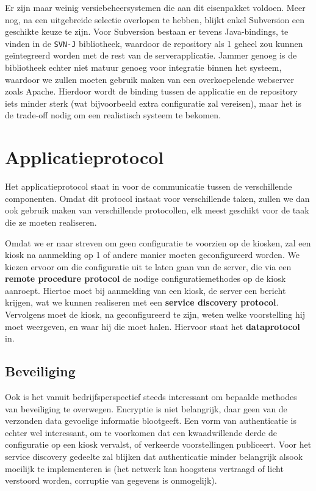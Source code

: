 Er zijn maar weinig versiebeheersystemen die aan dit eisenpakket voldoen. Meer nog, na een uitgebreide selectie overlopen te hebben, blijkt enkel Subversion een geschikte keuze te zijn. Voor Subversion bestaan er tevens Java-bindings, te vinden in de \texttt{SVN-J} bibliotheek, waardoor de repository als 1 geheel zou kunnen geïntegreerd worden met de rest van de serverapplicatie. Jammer genoeg is de bibliotheek echter niet matuur genoeg voor integratie binnen het systeem, waardoor we zullen moeten gebruik maken van een overkoepelende webserver zoals Apache. Hierdoor wordt de binding tussen de applicatie en de repository iets minder sterk (wat bijvoorbeeld extra configuratie zal vereisen), maar het is de trade-off nodig om een realistisch systeem te bekomen.

\section{Applicatieprotocol}
\label{sec:applicatieprotocol}

Het applicatieprotocol staat in voor de communicatie tussen de verschillende componenten. Omdat dit protocol instaat voor verschillende taken, zullen we dan ook gebruik maken van verschillende protocollen, elk meest geschikt voor de taak die ze moeten realiseren.

Omdat we er naar streven om geen configuratie te voorzien op de kiosken, zal een kiosk na aanmelding op 1 of andere manier moeten geconfigureerd worden. We kiezen ervoor om die configuratie uit te laten gaan van de server, die via een \textbf{remote procedure protocol} de nodige configuratiemethodes op de kiosk aanroept. Hiertoe moet bij aanmelding van een kiosk, de server een bericht krijgen, wat we kunnen realiseren met een \textbf{service discovery protocol}. Vervolgens moet de kiosk, na geconfigureerd te zijn, weten welke voorstelling hij moet weergeven, en waar hij die moet halen. Hiervoor staat het \textbf{dataprotocol} in.

\subsection{Beveiliging}

Ook is het vanuit bedrijfsperspectief steeds interessant om bepaalde methodes van beveiliging te overwegen. Encryptie is niet belangrijk, daar geen van de verzonden data gevoelige informatie blootgeeft. Een vorm van authenticatie is echter wel interessant, om te voorkomen dat een kwaadwillende derde de configuratie op een kiosk vervalst, of verkeerde voorstellingen publiceert. Voor het service discovery gedeelte zal blijken dat authenticatie minder belangrijk alsook moeilijk te implementeren is (het netwerk kan hoogstens vertraagd of licht verstoord worden, corruptie van gegevens is onmogelijk).

